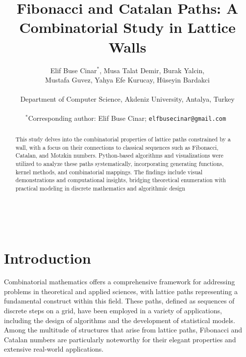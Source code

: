 \documentclass{article}
\title{Fibonacci and Catalan Paths: A Combinatorial Study in Lattice Walls}
\author{
Elif Buse Cinar$^{*}$, Musa Talat Demir, Burak Yalcin, \\ 
Mustafa Guvez, Yahya Efe Kurucay, Hüseyin Bardakci \\\\
\small Department of Computer Science, Akdeniz University, Antalya, Turkey \\\\     
\small $^{*}$Corresponding author: Elif Buse Cinar; \tt{elfbusecinar@gmail.com} 
}
\date{}
\begin{document}
\maketitle
\begin{abstract} 
\noindent This study delves into the combinatorial properties of lattice paths constrained by a wall, with a focus on their connections to classical sequences such as Fibonacci, Catalan, and Motzkin numbers. Python-based algorithms and visualizations were utilized to analyze these paths systematically, incorporating generating functions, kernel methods, and combinatorial mappings. The findings include visual demonstrations and computational insights, bridging theoretical enumeration with practical modeling in discrete mathematics and algorithmic design \end{abstract}

\noindent{}\\

\noindent{}

 
\section{Introduction}

Combinatorial mathematics offers a comprehensive framework for addressing problems in theoretical and applied sciences, with lattice paths representing a fundamental construct within this field. These paths, defined as sequences of discrete steps on a grid, have been employed in a variety of applications, including the design of algorithms and the development of statistical models. Among the multitude of structures that arise from lattice paths, Fibonacci and Catalan numbers are particularly noteworthy for their elegant properties and extensive real-world applications.
\end{document}
